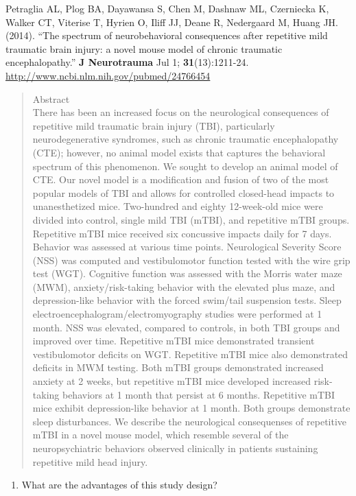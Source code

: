 \begin{enumerate}
Petraglia AL, Plog BA, Dayawansa S, Chen M, Dashnaw ML, Czerniecka K,
Walker CT, Viterise T, Hyrien O, Iliff JJ, Deane R, Nedergaard M,
Huang JH. (2014). ``The spectrum of neurobehavioral consequences after repetitive mild traumatic brain injury: a novel mouse model of chronic traumatic encephalopathy.''
{\bf J Neurotrauma} Jul 1; {\bf 31}(13):1211-24. 
\url{http://www.ncbi.nlm.nih.gov/pubmed/24766454}
{\footnotesize
\begin{quotation}
Abstract\\
There has been an increased focus on the neurological consequences of
repetitive mild traumatic brain injury (TBI), particularly
neurodegenerative syndromes, such as chronic traumatic encephalopathy
(CTE); however, no animal model exists that captures the behavioral
spectrum of this phenomenon. We sought to develop an animal model of
CTE. Our novel model is a modification and fusion of two of the most
popular models of TBI and allows for controlled closed-head impacts to
unanesthetized mice. Two-hundred and eighty 12-week-old mice were
divided into control, single mild TBI (mTBI), and repetitive mTBI
groups. Repetitive mTBI mice received six concussive impacts daily for
7 days. Behavior was assessed at various time points. Neurological
Severity Score (NSS) was computed and vestibulomotor function tested
with the wire grip test (WGT). Cognitive function was assessed with
the Morris water maze (MWM), anxiety/risk-taking behavior with the
elevated plus maze, and depression-like behavior with the forced
swim/tail suspension tests. Sleep
electroencephalogram/electromyography studies were performed at 1
month. NSS was elevated, compared to controls, in both TBI groups and
improved over time. Repetitive mTBI mice demonstrated transient
vestibulomotor deficits on WGT. Repetitive mTBI mice also demonstrated
deficits in MWM testing. Both mTBI groups demonstrated increased
anxiety at 2 weeks, but repetitive mTBI mice developed increased
risk-taking behaviors at 1 month that persist at 6 months. Repetitive
mTBI mice exhibit depression-like behavior at 1 month. Both groups
demonstrate sleep disturbances. We describe the neurological consequenses
of repetitive mTBI in a novel mouse model, which resemble several of
the neuropsychiatric behaviors observed clinically in patients
sustaining repetitive mild head injury.
\end{quotation}
}
\begin{enumerate}
\item  What are the advantages of this study design?
\begin{students}
 \vfill
\end{students}


\end{enumerate}
\end{enumerate}
